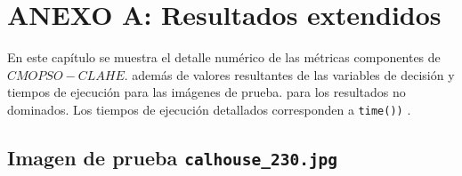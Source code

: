 \chapter*{ANEXO A: Resultados extendidos}
\label{ch:anexo}

En este capítulo se muestra el detalle numérico de las métricas componentes de $CMOPSO-CLAHE$. además de valores resultantes de las variables de decisión y tiempos de ejecución para las imágenes de prueba. para los resultados no dominados. Los tiempos de ejecución detallados corresponden a \texttt{time())} \cite{time}.


\section{Imagen de prueba \texttt{calhouse\_230.jpg}}

